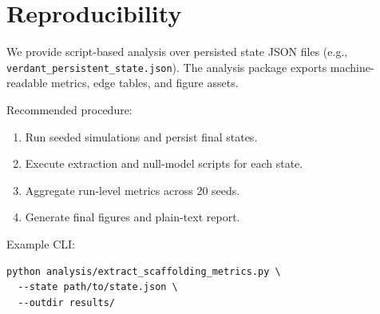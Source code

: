 \section{Reproducibility}
We provide script-based analysis over persisted state JSON files (e.g., \texttt{verdant\_persistent\_state.json}). The analysis package exports machine-readable metrics, edge tables, and figure assets.

Recommended procedure:
\begin{enumerate}[leftmargin=*]
  \item Run seeded simulations and persist final states.
  \item Execute extraction and null-model scripts for each state.
  \item Aggregate run-level metrics across 20 seeds.
  \item Generate final figures and plain-text report.
\end{enumerate}

Example CLI:
\begin{verbatim}
python analysis/extract_scaffolding_metrics.py \
  --state path/to/state.json \
  --outdir results/
\end{verbatim}

